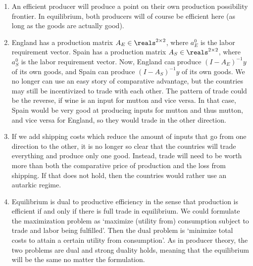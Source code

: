 \documentclass[10pt]{article}
\begin{document}
\begin{enumerate}
\begin{enumerate}
		\item An efficient producer will produce a point on their own production possibility frontier. In equilibrium, both producers will of course be efficient here (as long as the goods are actually good).
		\item England has a production matrix $A_E \in \reals^{2 \times 2}$, where $a^0_E$ is the labor requirement vector. Spain has a production matrix $A_S \in \reals^{2 \times 2}$, where $a^0_S$ is the labor requirement vector. Now, England can produce $(I-A_E)^{-1}y$ of its own goods, and Spain can produce $(I-A_S)^{-1}y$ of its own goods. We no longer can use an easy story of comparative advantage, but the countries may still be incentivized to trade with each other. The pattern of trade could be the reverse, if wine is an input for mutton and vice versa. In that case, Spain would be very good at producing inputs for mutton and thus mutton, and vice versa for England, so they would trade in the other direction.
		\item If we add shipping costs which reduce the amount of inputs that go from one direction to the other, it is no longer so clear that the countries will trade everything and produce only one good. Instead, trade will need to be worth more than both the comparative price of production and the loss from shipping. If that does not hold, then the countries would rather use an autarkic regime.
		\item Equilibrium is dual to productive efficiency in the sense that production is efficient if and only if there is full trade in equilibrium. We could formulate the maximization problem as `maximize (utility from) consumption subject to trade and labor being fulfilled'. Then the dual problem is `minimize total costs to attain a certain utility from consumption'. As in producer theory, the two problems are dual and strong duality holds, meaning that the equilibrium will be the same no matter the formulation.
	\end{enumerate}
\end{enumerate}
\end{document}
